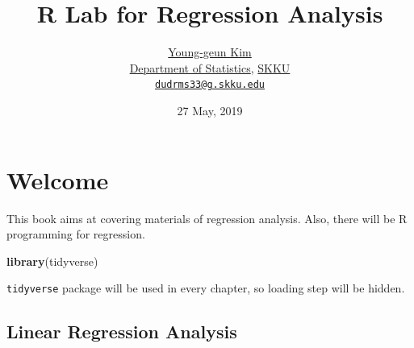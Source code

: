 \documentclass[]{book}
\title{R Lab for Regression Analysis}
\author{\href{https://github.com/ygeunkim}{Young-geun Kim}\\
\href{https://stat.skku.edu/stat/index.jsp}{Department of Statistics}, \href{https://www.skku.edu/skku/index.do}{SKKU}\\
\href{mailto:dudrms33@g.skku.edu}{\nolinkurl{dudrms33@g.skku.edu}}}
\date{27 May, 2019}
\newenvironment{Shaded}{\begin{snugshade}}{\end{snugshade}}
\newcommand{\CommentTok}[1]{\textcolor[rgb]{0.56,0.35,0.01}{\textit{#1}}}
\newcommand{\DataTypeTok}[1]{\textcolor[rgb]{0.13,0.29,0.53}{#1}}
\newcommand{\KeywordTok}[1]{\textcolor[rgb]{0.13,0.29,0.53}{\textbf{#1}}}
\newcommand{\NormalTok}[1]{#1}
\newcommand{\OperatorTok}[1]{\textcolor[rgb]{0.81,0.36,0.00}{\textbf{#1}}}
\newcommand{\StringTok}[1]{\textcolor[rgb]{0.31,0.60,0.02}{#1}}
\let\oldmaketitle\maketitle
\theoremstyle{definition}
\theoremstyle{definition}
\theoremstyle{definition}
\theoremstyle{remark}
\begin{document}
\maketitle

\begin{titlepage}
  
\end{titlepage}

\let\maketitle\oldmaketitle
\maketitle

{
\setcounter{tocdepth}{1}
\tableofcontents
}
\hypertarget{welcome}{%
\chapter*{Welcome}\label{welcome}}

This book aims at covering materials of regression analysis. Also, there will be R programming for regression.

\begin{Shaded}
\begin{Highlighting}[]
\KeywordTok{library}\NormalTok{(tidyverse)}
\end{Highlighting}
\end{Shaded}

\texttt{tidyverse} package will be used in every chapter, so loading step will be hidden.

\hypertarget{linear-regression-analysis}{%
\section*{Linear Regression Analysis}\label{linear-regression-analysis}}

\begin{Shaded}
\end{Shaded}
\end{document}
